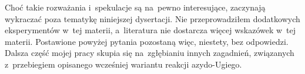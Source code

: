 Choć takie rozważania i~spekulacje są na~pewno interesujące, zaczynają wykraczać poza
  tematykę niniejszej dysertacji.
Nie przeprowadziłem dodatkowych eksperymentów w~tej materii, a~literatura nie dostarcza
  więcej wskazówek w~tej materii.
Postawione powyżej pytania pozostaną więc, niestety, bez odpowiedzi.
Dalsza część mojej pracy skupia się na~zgłębianiu innych zagadnień, związanych z~przebiegiem
  opisanego wcześniej wariantu reakcji azydo-Ugiego.
